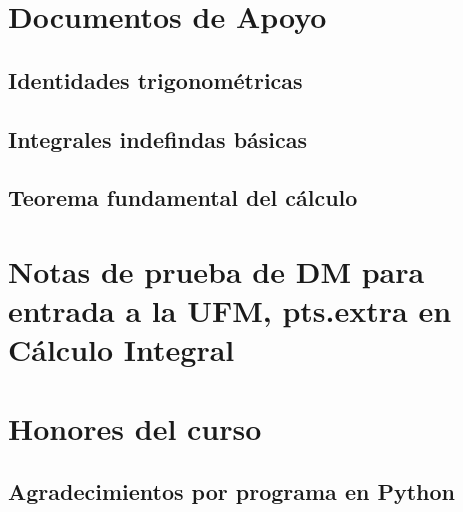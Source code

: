 \documentclass[openany]{book}
\begin{document}
\part{Documentos de Apoyo}
\chapter{Identidades trigonométricas}


\chapter{Integrales indefindas básicas}


\chapter{Teorema fundamental del cálculo}






\part{Notas de prueba de DM para entrada a la UFM, pts.extra en Cálculo Integral}




\part{Honores del curso}
\chapter{Agradecimientos por programa en Python}

\end{document}
